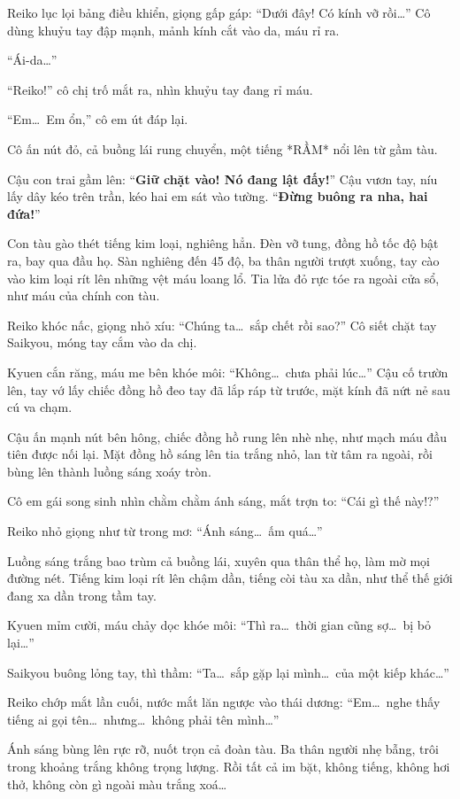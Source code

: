 \documentclass[../main.tex]{subfiles}
\begin{document}
Reiko lục lọi bảng điều khiển, giọng gấp gáp: ``Dưới đây! Có kính vỡ rồi\dots'' Cô dùng khuỷu tay đập mạnh, mảnh kính cắt vào da, máu rỉ ra.

``Ái-da\dots''

``Reiko!'' cô chị trố mắt ra, nhìn khuỷu tay đang rỉ máu.

``Em\dots\ Em ổn,'' cô em út đáp lại.

Cô ấn nút đỏ, cả buồng lái rung chuyển, một tiếng *RẦM* nổi lên từ gầm tàu.

Cậu con trai gầm lên: ``\textbf{Giữ chặt vào! Nó đang lật đấy!}'' Cậu vươn tay, níu lấy dây kéo trên trần, kéo hai em sát vào tường. ``\textbf{Đừng buông ra nha, hai đứa!}''

Con tàu gào thét tiếng kim loại, nghiêng hẳn. Đèn vỡ tung, đồng hồ tốc độ bật ra, bay qua đầu họ. Sàn nghiêng đến 45 độ, ba thân người trượt xuống, tay cào vào kim loại rít lên những vệt máu loang lổ. Tia lửa đỏ rực tóe ra ngoài cửa sổ, như máu của chính con tàu.

Reiko khóc nấc, giọng nhỏ xíu: ``Chúng ta\dots\ sắp chết rồi sao?'' Cô siết chặt tay Saikyou, móng tay cắm vào da chị.

Kyuen cắn răng, máu me bên khóe môi: ``Không\dots\ chưa phải lúc\dots'' Cậu cố trườn lên, tay vớ lấy chiếc đồng hồ đeo tay đã lắp ráp từ trước, mặt kính đã nứt nẻ sau cú va chạm.

Cậu ấn mạnh nút bên hông, chiếc đồng hồ rung lên nhè nhẹ, như mạch máu đầu tiên được nối lại. Mặt đồng hồ sáng lên tia trắng nhỏ, lan từ tâm ra ngoài, rồi bùng lên thành luồng sáng xoáy tròn.

Cô em gái song sinh nhìn chằm chằm ánh sáng, mắt trợn to: ``Cái gì thế này!?''

Reiko nhỏ giọng như từ trong mơ: ``Ánh sáng\dots\ ấm quá\dots''

Luồng sáng trắng bao trùm cả buồng lái, xuyên qua thân thể họ, làm mờ mọi đường nét. Tiếng kim loại rít lên chậm dần, tiếng còi tàu xa dần, như thể thế giới đang xa dần trong tầm tay.

Kyuen mỉm cười, máu chảy dọc khóe môi: ``Thì ra\dots\ thời gian cũng sợ\dots\ bị bỏ lại\dots''

Saikyou buông lỏng tay, thì thầm: ``Ta\dots\ sắp gặp lại mình\dots\ của một kiếp khác\dots''

Reiko chớp mắt lần cuối, nước mắt lăn ngược vào thái dương: ``Em\dots\ nghe thấy tiếng ai gọi tên\dots\ nhưng\dots\ không phải tên mình\dots''

Ánh sáng bùng lên rực rỡ, nuốt trọn cả đoàn tàu. Ba thân người nhẹ bẫng, trôi trong khoảng trắng không trọng lượng. Rồi tất cả im bặt, không tiếng, không hơi thở, không còn gì ngoài màu trắng xoá\dots
\end{document}
